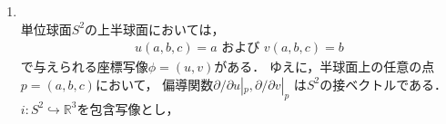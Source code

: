 \documentclass[dvipdfmx,a4paper,11pt]{jsarticle}
\begin{document}
\begin{enumerate}
  コンパクトな多様体$N$から$\mathbb{R}^m$への滑らかな写像
  $f$は臨界点をもつことを示せ．
  \begin{proof}
    第1成分への射影$\pi\colon\mathbb{R}^m\to\mathbb{R}$を用いて，
    $\pi\circ f\colon N\to\mathbb{R}$を考える．
    $N$はコンパクトで，$f$と$\pi$は連続であるから
    $\pi\circ f(N)$はコンパクトで，そのため有界閉集合．
    よって，$\pi\circ f$は最大値(と最小値)をもつ．\\
    $p\in N$を$\pi\circ f$の最大値を与える点とし，
    $(U,x^1,\dots,x^n)$を$p$を含むチャートとする．
    以下を考える．
    \begin{align}
      (\pi\circ f)_*\qty(\pdv{}{x^i}\bigg|_{p})
      &=\pdv{f^1}{x^i}\qty(p)\cdot \pdv{}{f^1}\bigg|_{f(p)}\\
      &=0
    \end{align}
    したがって，$f_*\qty(\partial/\partial x^i|_{p})$の
    第1成分は全ての$i$について0であり，
    そのため$f_*$は$p$で全射でない．つまり，$p$は臨界点である．
  \end{proof}
  \emph{別解1}\footnote{
    Tu多様体の回答
  }
  \begin{proof}
    $f$が臨界点をもたないと仮定すると，$f$は沈め込み
    (つまり，適切なチャートを取れば$f$は射影)．
    ここで$\pi\colon\mathbb{R}^m\to\mathbb{R}$を
    第1成分への射影とすると，
    $\pi\circ f\colon N\to\mathbb{R}$も沈め込みである
    (つまり，適切なチャートを取れば$\pi\circ f$は$x^1$)．
    しかし，$\pi\circ f(N)$はコンパクトであるから最大値を持ち，
    その点で臨界点となってしまう\footnote{
      \ref{secprob:8.10}参照．
    }ため矛盾．
  \end{proof}
  \emph{別解2}\footnote{
    Tu多様体の別解
  }
  \begin{proof}
    $f$が臨界点をもたないと仮定すると，$f$は沈めこみ．
    系11.6より$f$は開写像，滑らかという仮定も踏まえて同相写像となる．
    しかし，$N$はコンパクトであるから$f(N)$は開なコンパクト集合
    となるが，$\mathbb{R}^m$の部分集合でその条件を満たすものは
    空集合のみで，矛盾する．
  \end{proof}
  \item {}\\
  単位球面$S^2$の上半球面においては，
  \begin{align}
    u(a,b,c)=a\text{ および }v(a,b,c)=b
  \end{align}
  で与えられる座標写像$\phi=(u,v)$がある．
  ゆえに，半球面上の任意の点$p=(a,b,c)$において，
  偏導関数$\partial/\partial u|_p,\partial/\partial v|_p$
  は$S^2$の接ベクトルである．
  $i\colon S^2\hookrightarrow\mathbb{R}^3$を包含写像とし，

\end{enumerate}
\end{document}
